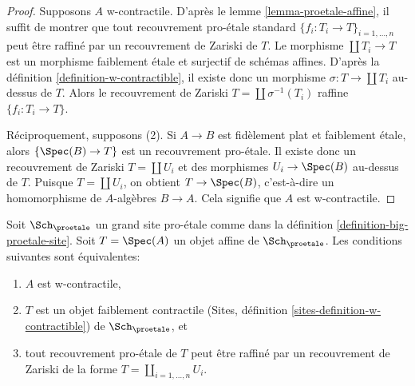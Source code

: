 \begin{proof}
Supposons $A$ w-contractile. D'après le lemme \ref{lemma-proetale-affine},
il suffit de montrer que tout recouvrement pro-\'etale standard
$\{f_i : T_i \to T\}_{i = 1, \ldots, n}$ peut être raffiné par un recouvrement de Zariski de $T$.
Le morphisme $\coprod T_i \to T$ est un morphisme faiblement \'etale et surjectif
de schémas affines. D'après la définition \ref{definition-w-contractible},
il existe donc un morphisme $\sigma : T \to \coprod T_i$ au-dessus de $T$.
Alors le recouvrement de Zariski $T = \coprod \sigma^{-1}(T_i)$
raffine $\{f_i : T_i \to T\}$.

\medskip\noindent
Réciproquement, supposons (2). Si $A \to B$ est fidèlement plat et faiblement \'etale,
alors $\{\Spec(B) \to T\}$ est un recouvrement pro-\'etale.
Il existe donc un recouvrement de Zariski $T = \coprod U_i$
et des morphismes $U_i \to \Spec(B)$ au-dessus de $T$. Puisque $T = \coprod U_i$,
on obtient $T \to \Spec(B)$, c'est-à-dire un homomorphisme de $A$-algèbres $B \to A$.
Cela signifie que $A$ est w-contractile.
\end{proof}

\begin{lemma}
\label{lemma-w-contractible-is-weakly-contractible}
Soit $\Sch_\proetale$ un grand site pro-\'etale comme dans la
définition \ref{definition-big-proetale-site}.
Soit $T = \Spec(A)$ un objet affine de $\Sch_\proetale$.
Les conditions suivantes sont équivalentes:
\begin{enumerate}
\item $A$ est w-contractile,
\item $T$ est un objet faiblement contractile
(Sites, définition \ref{sites-definition-w-contractible})
de $\Sch_\proetale$, et
\item tout recouvrement pro-\'etale de $T$ peut être raffiné par
un recouvrement de Zariski de la forme $T = \coprod_{i = 1, \ldots, n} U_i$.
\end{enumerate}
\end{lemma}

